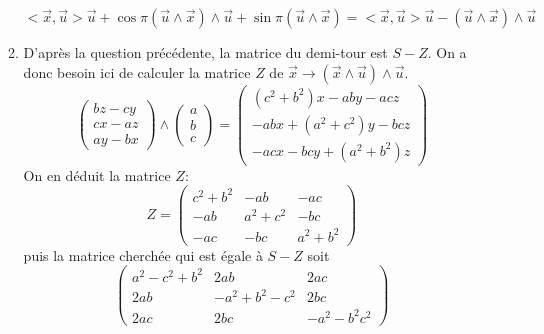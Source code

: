 \begin{enumerate}
\begin{enumerate}
\begin{displaymath}
<\overrightarrow{x},\overrightarrow{u}> \overrightarrow{u}
     + \cos \pi (\overrightarrow{u}\wedge\overrightarrow{x})\wedge \overrightarrow{u}
     + \sin \pi (\overrightarrow{u}\wedge\overrightarrow{x})
=
<\overrightarrow{x},\overrightarrow{u}> \overrightarrow{u} - 
(\overrightarrow{u}\wedge\overrightarrow{x})\wedge \overrightarrow{u}
\end{displaymath}
 \item D'après la question précédente, la matrice  du demi-tour est $S-Z$. On a donc besoin ici de calculer la matrice $Z$ de $\overrightarrow x \rightarrow (\overrightarrow x \wedge \overrightarrow u)\wedge \overrightarrow u$.
\begin{displaymath}
\begin{pmatrix}
bz-cy\\
cx-az\\
ay-bx 
\end{pmatrix}
\wedge
\begin{pmatrix}
  a \\ b \\ c
\end{pmatrix}
=
\begin{pmatrix}
 (c^2+b^2)x-aby-acz \\
-abx +(a^2+c^2)y -bcz \\
-acx -bcy +(a^2+b^2)z
\end{pmatrix}
\end{displaymath}
 On en déduit la matrice $Z$:
\begin{displaymath}
 Z=
\begin{pmatrix}
 c^2+b^2 & -ab & -ac \\
-ab & a^2+c^2 & -bc \\
-ac & -bc & a^2+b^2
\end{pmatrix}
\end{displaymath}
puis la matrice cherchée qui est égale à $S-Z$ soit
\begin{displaymath}
 \begin{pmatrix}
a^2-c^2+b^2 & 2ab & 2ac \\
2ab & -a^2+b^2-c^2 & 2bc \\
2ac & 2bc & -a^2-b^2c^2
 \end{pmatrix}
\end{displaymath}
\end{enumerate}

\end{enumerate}
